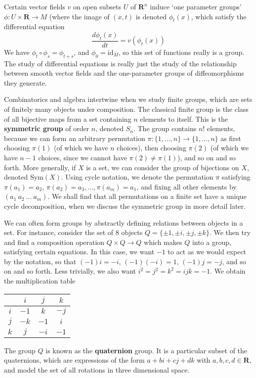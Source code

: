 \begin{example}
    Certain vector fields $v$ on open subsets $U$ of $\mathbf{R}^n$ induce `one parameter groups' $\phi: U \times \mathbf{R} \to M$ (where the image of $(x,t)$ is denoted $\phi_t(x)$, which satisfy the differential equation
    \[ \frac{d \phi_t(x)}{dt} = v(\phi_t(x)) \]
    We have $\phi_t \circ \phi_s = \phi_{t + s}$, and $\phi_0 = \text{id}_M$, so this set of functions really is a group. The study of differential equations is really just the study of the relationship between smooth vector fields and the one-parameter groups of diffeomorphisms they generate.
\end{example}

\begin{example}
    Combinatorics and algebra intertwine when we study finite groups, which are sets of finitely many objects under composition. The classical finite group is the class of all bijective maps from a set containing $n$ elements to itself. This is the {\bf symmetric group} of order $n$, denoted $S_n$. The group contains $n!$ elements, because we can form an arbitrary permutation $\pi: \{ 1, \dots, n \} \to \{ 1, \dots, n \}$ as first choosing $\pi(1)$ (of which we have $n$ choices), then choosing $\pi(2)$ (of which we have $n-1$ choices, since we cannot have $\pi(2) \neq \pi(1)$), and so on and so forth. More generally, if $X$ is a set, we can consider the group of bijections on $X$, denoted $\text{Sym}(X)$. Using cycle notation, we denote the permutation $\pi$ satisfying $\pi(a_1) = a_2$, $\pi(a_2) = a_3, \dots, \pi(a_m) = a_1$, and fixing all other elements by $(a_1\ a_2\ \dots\ a_m)$. We shall find that all permutations on a finite set have a unique cycle decomposition, when we discuss the symmetric group in more detail later.
\end{example}

\begin{example}
    We can often form groups by abstractly defining relations between objects in a set. For instance, consider the set of 8 objects $Q = \{ \pm 1, \pm i, \pm j, \pm k \}$. We then try and find a composition operation $Q \times Q \to Q$ which makes $Q$ into a group, satisfying certain equations. In this case, we want $-1$ to act as we would expect by the notation, so that $(-1)i = -i$, $(-1)(-i) = 1$, $(-1)j = -j$, and so on and so forth. Less trivially, we also want $i^2 = j^2 = k^2 = ijk = -1$. We obtain the multiplication table
    \begin{center}
    \begin{tabular}{| c | c c c}
        & $i$ & $j$ & $k$ \\ \hline $i$ & $-1$ & $k$ & $-j$ \\ $j$ & $-k$ & $-1$ & $i$ \\ $k$ & $j$ & $-i$ & $-1$
    \end{tabular}
    \end{center}
    The group $Q$ is known as the {\bf quaternion} group. It is a particular subset of the quaternions, which are expressions of the form $a + bi + cj + dk$ with $a,b,c,d \in \mathbf{R}$, and model the set of all rotations in three dimensional space.
\end{example}

